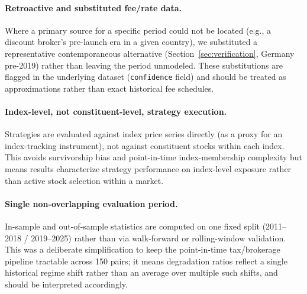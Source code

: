 \documentclass[11pt]{article}
\begin{document}
\paragraph{Retroactive and substituted fee/rate data.} Where a primary source for a specific period could not be located (e.g., a discount broker's pre-launch era in a given country), we substituted a representative contemporaneous alternative (Section~\ref{sec:verification}, Germany pre-2019) rather than leaving the period unmodeled. These substitutions are flagged in the underlying dataset (\texttt{confidence} field) and should be treated as approximations rather than exact historical fee schedules.

\paragraph{Index-level, not constituent-level, strategy execution.} Strategies are evaluated against index price series directly (as a proxy for an index-tracking instrument), not against constituent stocks within each index. This avoids survivorship bias and point-in-time index-membership complexity but means results characterize strategy performance on index-level exposure rather than active stock selection within a market.

\paragraph{Single non-overlapping evaluation period.} In-sample and out-of-sample statistics are computed on one fixed split (2011--2018 / 2019--2025) rather than via walk-forward or rolling-window validation. This was a deliberate simplification to keep the point-in-time tax/brokerage pipeline tractable across 150 pairs; it means degradation ratios reflect a single historical regime shift rather than an average over multiple such shifts, and should be interpreted accordingly.
\end{document}
